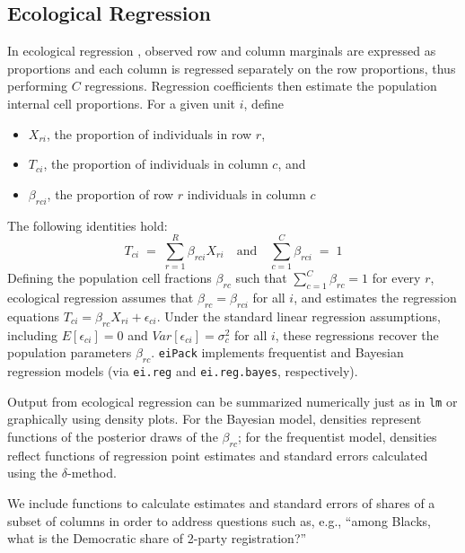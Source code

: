 \documentclass[12pt]{article}
\begin{document}
\subsection{Ecological Regression}

In ecological regression \citep{Goodman53}, observed row and column
marginals are expressed as proportions and each column is regressed
separately on the row proportions, thus performing $C$ regressions.  
Regression coefficients then estimate the population internal cell
proportions.  For a given unit $i$, define

\begin{itemize}
\item $X_{ri}$, the proportion of individuals in row $r$,
\item $T_{ci}$, the proportion of individuals in column $c$, and
\item $\beta_{rci}$, the proportion of row $r$ individuals in column
$c$
\end{itemize}

\noindent The following identities hold:
\begin{displaymath}
T_{ci} \; = \; \sum_{r=1}^R \beta_{rci} X_{ri} \quad \textrm{and} \quad \sum_{c=1}^{C} \beta_{rci}  \; = \; 1    
\end{displaymath}
\noindent  Defining the population cell fractions $\beta_{rc}$ such that
$\sum_{c=1}^C \beta_{rc} = 1$ for every $r$, ecological regression assumes that
$\beta_{rc} = \beta_{rci}$ for all $i$, and estimates the regression
equations $T_{ci} = \beta_{rc} X_{ri} + \epsilon_{ci}$.  Under the
standard linear regression assumptions, including $E[\epsilon_{ci}] =
0$ and $Var[\epsilon_{ci}] = \sigma_c^2$ for all $i$, these
regressions recover the population parameters $\beta_{rc}$.
\texttt{eiPack} implements frequentist and Bayesian regression models (via
{\tt ei.reg} and {\tt ei.reg.bayes}, respectively).


Output from ecological regression can be summarized numerically just
as in \texttt{lm} or graphically using density plots.  For the
Bayesian model, densities represent functions of the posterior draws
of the $\beta_{rc}$; for the frequentist model, densities reflect
functions of regression point estimates and standard errors calculated
using the $\delta$-method.

We include functions to calculate estimates and standard errors of
shares of a subset of columns in order to address questions such as, e.g.,
``among Blacks, what is the Democratic share of 2-party
registration?''  
\end{document}
